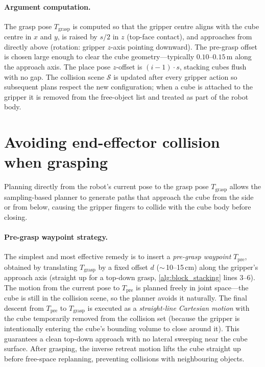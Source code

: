 \documentclass{article}
\begin{document}
\paragraph{Argument computation.}
The grasp pose $T_\text{grasp}$ is computed so that the gripper centre aligns with the cube centre in $x$ and $y$, is raised by $s/2$ in $z$ (top-face contact), and approaches from directly above (rotation: gripper $z$-axis pointing downward).
The pre-grasp offset is chosen large enough to clear the cube geometry---typically $0.10$--$0.15$\,m along the approach axis.
The place pose $z$-offset is $(i-1) \cdot s$, stacking cubes flush with no gap.
The collision scene $\mathcal{S}$ is updated after every gripper action so subsequent plans respect the new configuration; when a cube is attached to the gripper it is removed from the free-object list and treated as part of the robot body.


\section{Avoiding end-effector collision when grasping}
\label{sec:collision}

Planning directly from the robot's current pose to the grasp pose $T_\text{grasp}$ allows the sampling-based planner to generate paths that approach the cube from the side or from below, causing the gripper fingers to collide with the cube body before closing.

\paragraph{Pre-grasp waypoint strategy.}
The simplest and most effective remedy is to insert a \emph{pre-grasp waypoint} $T_\text{pre}$, obtained by translating $T_\text{grasp}$ by a fixed offset $d$ ($\sim$\,10--15\,cm) along the gripper's approach axis (straight up for a top-down grasp, \cref{alg:block_stacking} lines 3--6).
The motion from the current pose to $T_\text{pre}$ is planned freely in joint space---the cube is still in the collision scene, so the planner avoids it naturally.
The final descent from $T_\text{pre}$ to $T_\text{grasp}$ is executed as a \emph{straight-line Cartesian motion} with the cube temporarily removed from the collision set (because the gripper is intentionally entering the cube's bounding volume to close around it).
This guarantees a clean top-down approach with no lateral sweeping near the cube surface.
After grasping, the inverse retreat motion lifts the cube straight up before free-space replanning, preventing collisions with neighbouring objects.
\end{document}
